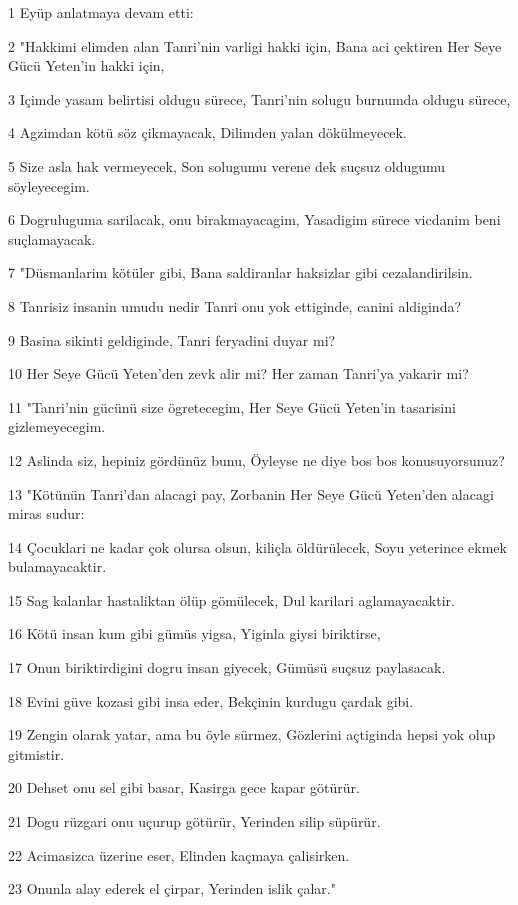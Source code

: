 \par 1 Eyüp anlatmaya devam etti:
\par 2 "Hakkimi elimden alan Tanri'nin varligi hakki için, Bana aci çektiren Her Seye Gücü Yeten'in hakki için,
\par 3 Içimde yasam belirtisi oldugu sürece, Tanri'nin solugu burnumda oldugu sürece,
\par 4 Agzimdan kötü söz çikmayacak, Dilimden yalan dökülmeyecek.
\par 5 Size asla hak vermeyecek, Son solugumu verene dek suçsuz oldugumu söyleyecegim.
\par 6 Dogruluguma sarilacak, onu birakmayacagim, Yasadigim sürece vicdanim beni suçlamayacak.
\par 7 "Düsmanlarim kötüler gibi, Bana saldiranlar haksizlar gibi cezalandirilsin.
\par 8 Tanrisiz insanin umudu nedir Tanri onu yok ettiginde, canini aldiginda?
\par 9 Basina sikinti geldiginde, Tanri feryadini duyar mi?
\par 10 Her Seye Gücü Yeten'den zevk alir mi? Her zaman Tanri'ya yakarir mi?
\par 11 "Tanri'nin gücünü size ögretecegim, Her Seye Gücü Yeten'in tasarisini gizlemeyecegim.
\par 12 Aslinda siz, hepiniz gördünüz bunu, Öyleyse ne diye bos bos konusuyorsunuz?
\par 13 "Kötünün Tanri'dan alacagi pay, Zorbanin Her Seye Gücü Yeten'den alacagi miras sudur:
\par 14 Çocuklari ne kadar çok olursa olsun, kiliçla öldürülecek, Soyu yeterince ekmek bulamayacaktir.
\par 15 Sag kalanlar hastaliktan ölüp gömülecek, Dul karilari aglamayacaktir.
\par 16 Kötü insan kum gibi gümüs yigsa, Yiginla giysi biriktirse,
\par 17 Onun biriktirdigini dogru insan giyecek, Gümüsü suçsuz paylasacak.
\par 18 Evini güve kozasi gibi insa eder, Bekçinin kurdugu çardak gibi.
\par 19 Zengin olarak yatar, ama bu öyle sürmez, Gözlerini açtiginda hepsi yok olup gitmistir.
\par 20 Dehset onu sel gibi basar, Kasirga gece kapar götürür.
\par 21 Dogu rüzgari onu uçurup götürür, Yerinden silip süpürür.
\par 22 Acimasizca üzerine eser, Elinden kaçmaya çalisirken.
\par 23 Onunla alay ederek el çirpar, Yerinden islik çalar."

